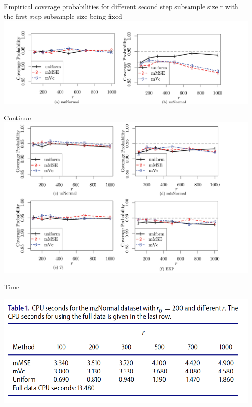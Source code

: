 \documentclass[12pt]{beamer}
\begin{document}
\begin{frame}{Empirical coverage probabilities for different second step subsample size r with the first step subsample size being fixed}
\includegraphics[scale=0.8]{fig10.png} 
\end{frame}

\begin{frame}{Continue}
\includegraphics[scale=0.8]{fig11.png} 
\end{frame}


\begin{frame}{Time}
\begin{center}
\includegraphics[scale=0.8]{fig12.png} 
\end{center}
\end{frame}
\end{document}
